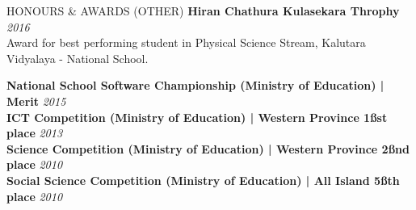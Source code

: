 \documentclass{cv}
\begin{document}

\begin{rSection}{HONOURS \& AWARDS (OTHER)}
    {\bf Hiran Chathura Kulasekara Throphy}                                                         \hfill {\em 2016}
    \\Award for best performing student in Physical Science Stream, Kalutara Vidyalaya - National School. \par
    {\bf National School Software Championship (Ministry of Education) | Merit}     \hfill {\em 2015} \\
    {\bf ICT Competition (Ministry of Education) | Western Province 1\ss{st} place}      \hfill {\em 2013}\\
    {\bf Science Competition (Ministry of Education) | Western Province 2\ss{nd} place}   \hfill {\em 2010}\\
    {\bf Social Science Competition (Ministry of Education) | All Island 5\ss{th} place}  \hfill {\em 2010}
\end{rSection}

\end{document}
